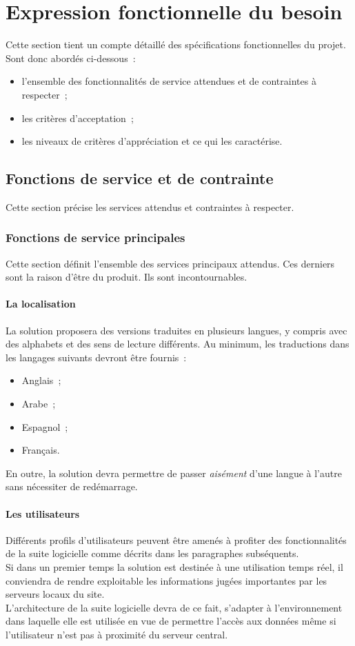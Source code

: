 \chapter{Expression fonctionnelle du besoin}
Cette section tient un compte détaillé des spécifications fonctionnelles du projet. Sont donc abordés ci-dessous~:
\begin{itemize}
\item l'ensemble des fonctionnalités de service attendues et de contraintes à respecter~;
\item les critères d'acceptation~;
\item les niveaux de critères d'appréciation et ce qui les caractérise.
\end{itemize}

\section{Fonctions de service et de contrainte}
Cette section précise les services attendus et contraintes à respecter.

\subsection{Fonctions de service principales}
Cette section définit l'ensemble des services principaux attendus. Ces derniers sont la raison d'être du produit. Ils sont incontournables.

\subsubsection{La localisation}
La solution proposera des versions traduites en plusieurs langues, y compris avec des alphabets et des sens de lecture différents. Au minimum, les traductions dans les langages suivants devront être fournis~:
\begin{itemize}
\item Anglais~;
\item Arabe~;
\item Espagnol~;
\item Français.
\end{itemize}
En outre, la solution devra permettre de passer \emph{aisément} d'une langue à l'autre sans nécessiter de redémarrage.

\subsubsection{Les utilisateurs}
Différents profils d'utilisateurs peuvent être amenés à profiter des fonctionnalités de la suite logicielle comme décrits dans les paragraphes subséquents.
\\
Si dans un premier temps la solution est destinée à une utilisation temps réel, il conviendra de rendre exploitable les informations jugées importantes par les serveurs locaux du site.
\\
L'architecture de la suite logicielle devra de ce fait, s'adapter à l'environnement dans laquelle elle est utilisée en vue de permettre l'accès aux données même si l'utilisateur n'est pas à proximité du serveur central.

